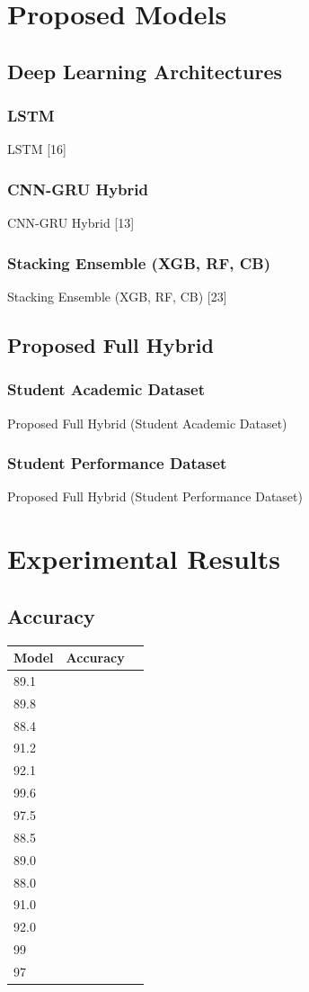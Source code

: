 \documentclass[twocolumn]{svjour3}
\begin{document}
\section{Proposed Models}
\subsection{Deep Learning Architectures}
\subsubsection{LSTM}
LSTM [16]
\subsubsection{CNN-GRU Hybrid}
CNN-GRU Hybrid [13]
\subsubsection{Stacking Ensemble (XGB, RF, CB)}
Stacking Ensemble (XGB, RF, CB) [23]
\subsection{Proposed Full Hybrid}
\subsubsection{Student Academic Dataset}
Proposed Full Hybrid (Student Academic Dataset)
\subsubsection{Student Performance Dataset}
Proposed Full Hybrid (Student Performance Dataset)
\section{Experimental Results}
\subsection{Accuracy}
\begin{tabular}{lll}
\hline
Model & Accuracy & \\
\hline
89.1 & & \\
89.8 & & \\
88.4 & & \\
91.2 & & \\
92.1 & & \\
99.6 & & \\
97.5 & & \\
88.5 & & \\
89.0 & & \\
88.0 & & \\
91.0 & & \\
92.0 & & \\
99 & & \\
97 & & \\
\hline
\end{tabular}
\end{document}
